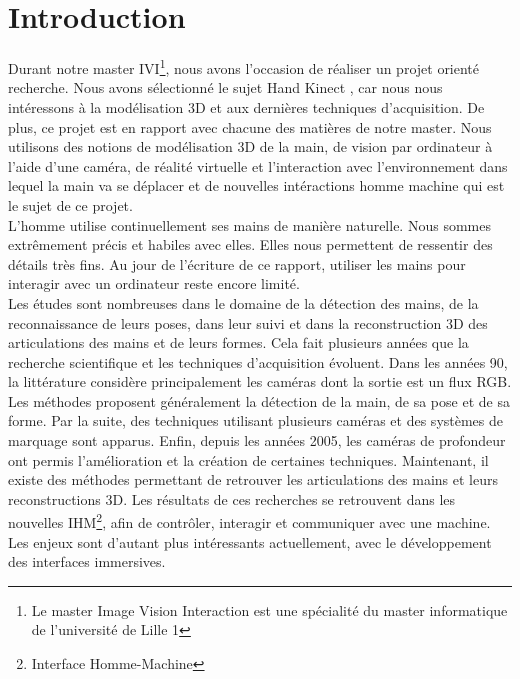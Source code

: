 \chapter*{Introduction}

Durant notre master IVI\footnote{Le master Image Vision Interaction est 
une spécialité du master informatique de l'université de Lille 1}, 
nous avons l'occasion de réaliser un projet orienté recherche. Nous avons 
sélectionné le sujet \og Hand Kinect \fg, car nous nous intéressons à la 
modélisation 3D et aux dernières techniques d'acquisition.
De plus, ce projet est en rapport avec chacune des matières de
notre master. Nous utilisons des notions de modélisation 3D de la main, de vision par ordinateur à l'aide d'une caméra, de réalité virtuelle et l'interaction avec l'environnement dans lequel la main va se déplacer et de nouvelles intéractions
homme machine qui est le sujet de ce projet.\\

L'homme utilise continuellement ses mains de manière naturelle. Nous 
sommes extrêmement précis et habiles avec elles. Elles nous permettent 
de ressentir des détails très fins. Au jour de l'écriture de ce rapport, 
utiliser les mains pour interagir avec un ordinateur reste encore limité.\\

Les études sont nombreuses dans le domaine de la détection des mains, 
de la reconnaissance de leurs poses, dans leur suivi et dans la reconstruction 
3D des articulations des mains et de leurs formes. Cela fait plusieurs 
années que la recherche scientifique et les techniques d'acquisition 
évoluent. Dans les années 90, la littérature considère principalement les 
caméras dont la sortie est un flux RGB. Les méthodes proposent généralement la 
détection de la main, de sa pose et de sa forme. Par la suite, des techniques 
utilisant plusieurs caméras et des systèmes de marquage sont apparus. 
Enfin, depuis les années 2005, les caméras de profondeur ont permis 
l'amélioration et la création de certaines techniques. Maintenant, il 
existe des méthodes permettant de retrouver les articulations des mains 
et leurs reconstructions 3D. Les résultats de ces recherches se 
retrouvent dans les nouvelles IHM\footnote{Interface Homme-Machine}, 
afin de contrôler, interagir et communiquer avec une machine. Les enjeux 
sont d'autant plus intéressants actuellement, avec le développement des 
interfaces immersives.\\

